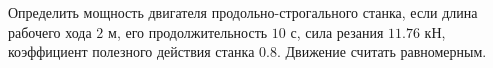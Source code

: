 Определить мощность двигателя продольно-строгального станка, если длина
рабочего хода $2$ м, его продолжительность $10$ с, сила резания
$11.76$ кН, коэффициент полезного действия станка $0.8$. Движение
считать равномерным.
